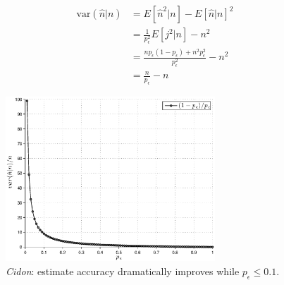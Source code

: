 \documentclass[11pt,a4paper,twoside,openright]{book}
\newcommand{\pc}{p_{\epsilon}}
\begin{document}
\begin{equation}
\begin{split}
\textrm{var}(\hat{n}|n) & =E[\hat{n}^{2}|n]- E[\hat{n}|n]^{2}\\
& = \frac{1}{\pc^{2}}E[j^{2}|n] - n^{2}\\
& = \frac{n\pc(1-\pc)+n^{2}\pc^{2}}{\pc^{2}}- n^{2}\\
& =  \frac{n}{\pc}-n
\end{split}
\end{equation}

\begin{figure}[htbp]
\begin{center}
\includegraphics[width=0.7\textwidth]{matlab/Cidon/cidon-variance-p}
\caption[\emph{Cidon}: Variance behavior]{\emph{Cidon}:  estimate accuracy dramatically improves while $\pc\leq0.1$.}
\end{center}
\end{figure}
\end{document}
